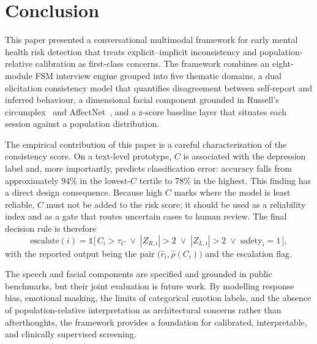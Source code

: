 \documentclass[12pt]{article}
\begin{document}
\section{Conclusion}

This paper presented a conversational multimodal framework for early
mental health risk detection that treats explicit--implicit
inconsistency and population-relative calibration as first-class
concerns. The framework combines an eight-module FSM interview engine
grouped into five thematic domains, a dual elicitation consistency model
that quantifies disagreement between self-report and inferred behaviour,
a dimensional facial component grounded in Russell's
circumplex~\cite{russell1980circumplex} and
AffectNet~\cite{mollahosseini2017affectnet}, and a z-score baseline
layer that situates each session against a population distribution.

The empirical contribution of this paper is a careful characterisation
of the consistency score. On a text-level prototype, $C$ is associated
with the depression label and, more importantly, predicts classification
error: accuracy falls from approximately 94\% in the lowest-$C$ tertile
to 78\% in the highest. This finding has a direct design consequence.
Because high $C$ marks where the model is least reliable, $C$ must not
be added to the risk score; it should be used as a reliability index
and as a gate that routes uncertain cases to human review. The final
decision rule is therefore
\begin{equation}
\text{escalate}(i) =
\mathbb{1}\bigl[\,C_i > \tau_{C} \;\lor\; |Z_{R,i}| > 2
\;\lor\; |Z_{L,i}| > 2 \;\lor\; \text{safety}_i = 1\,\bigr],
\end{equation}
with the reported output being the pair $\bigl(\hat{r}_i,
\hat{\rho}(C_i)\bigr)$ and the escalation flag.

The speech and facial components are specified and grounded in public
benchmarks, but their joint evaluation is future work. By modelling
response bias, emotional masking, the limits of categorical emotion
labels, and the absence of population-relative interpretation as
architectural concerns rather than afterthoughts, the framework provides
a foundation for calibrated, interpretable, and clinically supervised
screening.



\end{document}
